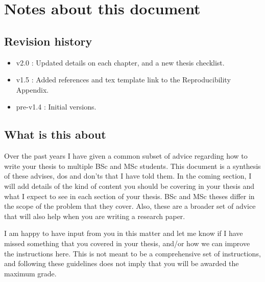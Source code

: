 \chapter*{Notes about this document}
\section*{Revision history}
\begin{itemize}
    \item v2.0     : Updated details on each chapter, and a new thesis checklist.
    \item v1.5     : Added references and tex template link to the Reproducibility Appendix. 
    \item pre-v1.4 : Initial versions. 
\end{itemize}

\section*{What is this about}
Over the past years I have given a common subset of advice regarding how to write your thesis to multiple BSc 
and MSc students. This document is a synthesis of these advises, dos and don'ts that I have told them. 
In the coming section, I will add details of the kind of content you should be covering in your thesis and 
what I expect to see in each section of your thesis. BSc and MSc theses differ in the scope of the problem that 
they cover. Also, these are a broader set of advice that will also help when you are writing a research paper. 


I am happy to have input from you in this matter and let me know if I have missed something that you covered in 
your thesis, and/or how we can improve the instructions here. This is not meant to be a comprehensive set 
of instructions, and following these guidelines does not imply that you will be awarded the maximum grade. 

